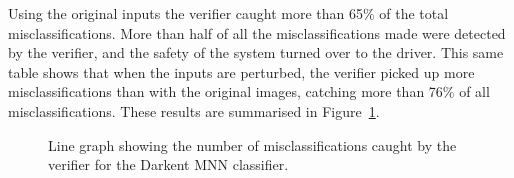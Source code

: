 \begin{table}[h]
	\centering
	\caption{Table showing the results of the \ac{AV} prediction \ac{MNN}}
	\label{tbl:sign-resultsfull}
\end{table}

Using the original inputs the verifier caught more than 65\% of the total misclassifications.
More than half of all the misclassifications made were detected by the verifier, and the safety of the system turned over to the driver.
This same table shows that when the inputs are perturbed, the verifier picked up more misclassifications than with the original images, catching more than 76\% of all misclassifications.
These results are summarised in Figure~\ref{fig:sign-graphboth}.

\begin{figure}[H]
	\centering
	\scalebox{0.9}{}
	\caption{Line graph showing the number of misclassifications caught by the verifier for the Darkent \ac{MNN} classifier. \label{fig:sign-graphboth}}
\end{figure}

